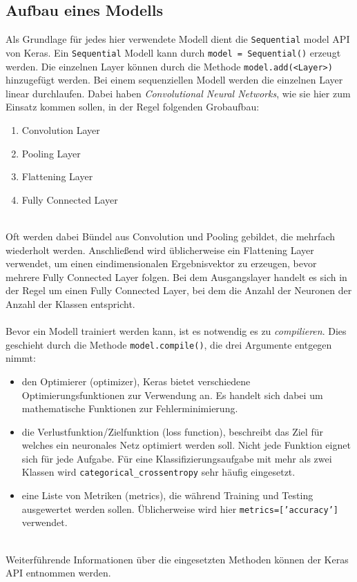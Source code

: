 \subsection{Aufbau eines Modells}
Als Grundlage für jedes hier verwendete Modell dient die \texttt{Sequential} model API von Keras. Ein \texttt{Sequential} Modell kann durch \texttt{model = Sequential()} erzeugt werden. Die einzelnen Layer können durch die Methode \texttt{model.add(<Layer>)} hinzugefügt werden.
Bei einem sequenziellen Modell werden die einzelnen Layer linear durchlaufen. Dabei haben \textit{Convolutional Neural Networks}, wie sie hier zum Einsatz kommen sollen, in der Regel folgenden Grobaufbau:
\begin{enumerate}
	\item Convolution Layer
	\item Pooling Layer
	\item Flattening Layer
	\item Fully Connected Layer
\end{enumerate} \ \\
Oft werden dabei Bündel aus Convolution und Pooling gebildet, die mehrfach wiederholt werden. Anschließend wird üblicherweise ein Flattening Layer verwendet, um einen eindimensionalen Ergebnisvektor zu erzeugen, bevor mehrere Fully Connected Layer folgen. Bei dem Ausgangslayer handelt es sich in der Regel um einen Fully Connected Layer, bei dem die Anzahl der Neuronen der Anzahl der Klassen entspricht. \\
\\
Bevor ein Modell trainiert werden kann, ist es notwendig es zu \textit{compilieren}. Dies geschieht durch die Methode \texttt{model.compile()}, die drei Argumente entgegen nimmt:

\begin{itemize}
	\item den Optimierer (optimizer), Keras bietet verschiedene Optimierungsfunktionen zur Verwendung an. Es handelt sich dabei um mathematische Funktionen zur Fehlerminimierung. 
	\item die Verlustfunktion/Zielfunktion (loss function), beschreibt das Ziel für welches ein neuronales Netz optimiert werden soll. Nicht jede Funktion eignet sich für jede Aufgabe. Für eine Klassifizierungsaufgabe mit mehr als zwei Klassen wird \texttt{categorical\_crossentropy} sehr häufig eingesetzt.
	\item eine Liste von Metriken (metrics), die während Training und Testing ausgewertet werden sollen. Üblicherweise wird hier \texttt{metrics=['accuracy']} verwendet.
\end{itemize} \ \\
Weiterführende Informationen über die eingesetzten Methoden können der Keras API \cite{keras} entnommen werden.

